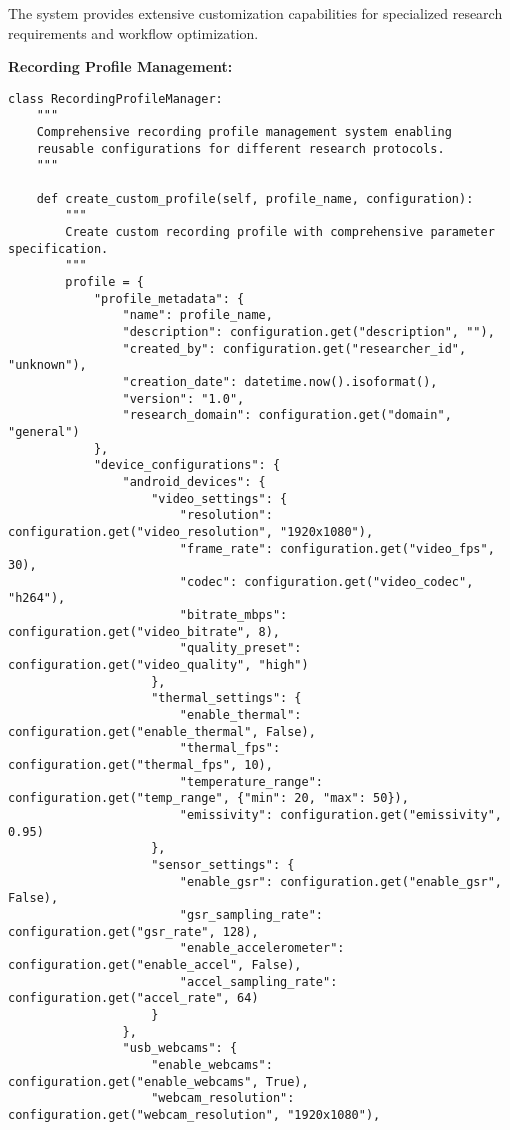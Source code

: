 \documentclass[12pt,a4paper]{article}
\begin{document}
The system provides extensive customization capabilities for specialized research requirements and workflow
optimization.

\textbf{Recording Profile Management:}

\begin{verbatim}
class RecordingProfileManager:
    """
    Comprehensive recording profile management system enabling
    reusable configurations for different research protocols.
    """
    
    def create_custom_profile(self, profile_name, configuration):
        """
        Create custom recording profile with comprehensive parameter specification.
        """
        profile = {
            "profile_metadata": {
                "name": profile_name,
                "description": configuration.get("description", ""),
                "created_by": configuration.get("researcher_id", "unknown"),
                "creation_date": datetime.now().isoformat(),
                "version": "1.0",
                "research_domain": configuration.get("domain", "general")
            },
            "device_configurations": {
                "android_devices": {
                    "video_settings": {
                        "resolution": configuration.get("video_resolution", "1920x1080"),
                        "frame_rate": configuration.get("video_fps", 30),
                        "codec": configuration.get("video_codec", "h264"),
                        "bitrate_mbps": configuration.get("video_bitrate", 8),
                        "quality_preset": configuration.get("video_quality", "high")
                    },
                    "thermal_settings": {
                        "enable_thermal": configuration.get("enable_thermal", False),
                        "thermal_fps": configuration.get("thermal_fps", 10),
                        "temperature_range": configuration.get("temp_range", {"min": 20, "max": 50}),
                        "emissivity": configuration.get("emissivity", 0.95)
                    },
                    "sensor_settings": {
                        "enable_gsr": configuration.get("enable_gsr", False),
                        "gsr_sampling_rate": configuration.get("gsr_rate", 128),
                        "enable_accelerometer": configuration.get("enable_accel", False),
                        "accel_sampling_rate": configuration.get("accel_rate", 64)
                    }
                },
                "usb_webcams": {
                    "enable_webcams": configuration.get("enable_webcams", True),
                    "webcam_resolution": configuration.get("webcam_resolution", "1920x1080"),

\end{verbatim}
\end{document}
